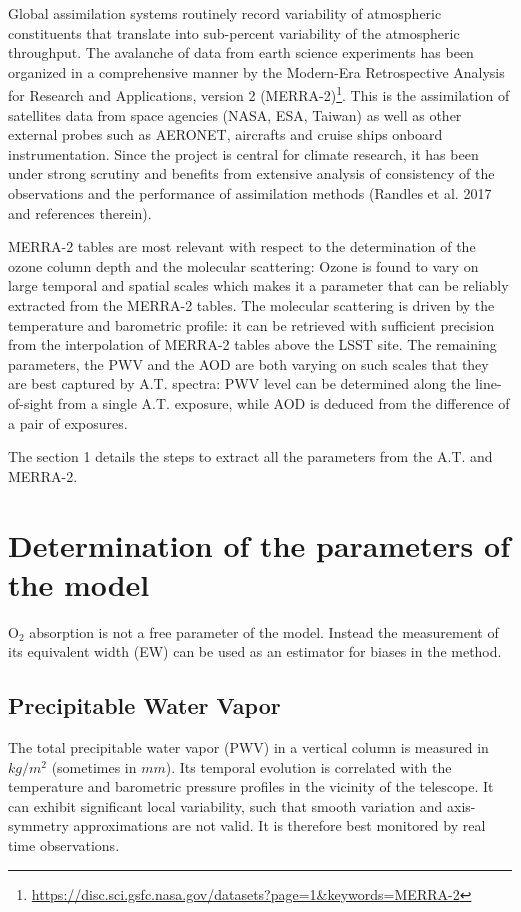 \documentclass[onecolumn]{aa}
\begin{document}
Global assimilation systems routinely record variability of atmospheric constituents that translate into sub-percent variability of the atmospheric throughput. The avalanche of data from earth science experiments has been organized in a comprehensive manner by the Modern-Era Retrospective Analysis for Research and Applications, version 2 (MERRA-2)\footnote{\url{https://disc.sci.gsfc.nasa.gov/datasets?page=1&keywords=MERRA-2}}. This is the assimilation of satellites data from space agencies (NASA, ESA, Taiwan) as well as other external probes such as AERONET, aircrafts and cruise ships onboard instrumentation. Since the project is central for climate research, it has been under strong scrutiny and benefits from extensive analysis of consistency of the observations and the performance of assimilation methods (Randles et al. 2017 and references therein).

MERRA-2 tables are most relevant with respect to the determination of the ozone column depth and the molecular scattering: Ozone is found to vary on large temporal and spatial scales which makes it a parameter that can be reliably extracted from the MERRA-2 tables. The molecular scattering is driven by the temperature and barometric profile: it can be retrieved with sufficient precision from the interpolation of MERRA-2 tables above the LSST site. The remaining parameters, the PWV and the AOD are both varying on such scales that they are best captured by A.T. spectra: PWV level can be determined along the line-of-sight from a single A.T. exposure, while AOD is deduced from the difference of a pair of exposures. 

The section 1 details the steps to extract all the parameters from the A.T. and MERRA-2.


\section{Determination of the parameters of the model}


$\textrm{O}_2$ absorption is not a free parameter of the model. Instead the measurement of its equivalent width (EW) can be used as an estimator for biases in the method.


\subsection{Precipitable Water Vapor}


The total precipitable water vapor (PWV) in a vertical column is measured in $kg/m^2$ (sometimes in $mm$).  Its temporal evolution is correlated with the temperature and barometric pressure profiles in the vicinity of the telescope. It can exhibit significant local variability, such that smooth variation and axis-symmetry approximations are not valid. It is therefore best monitored by real time observations.
\end{document}
